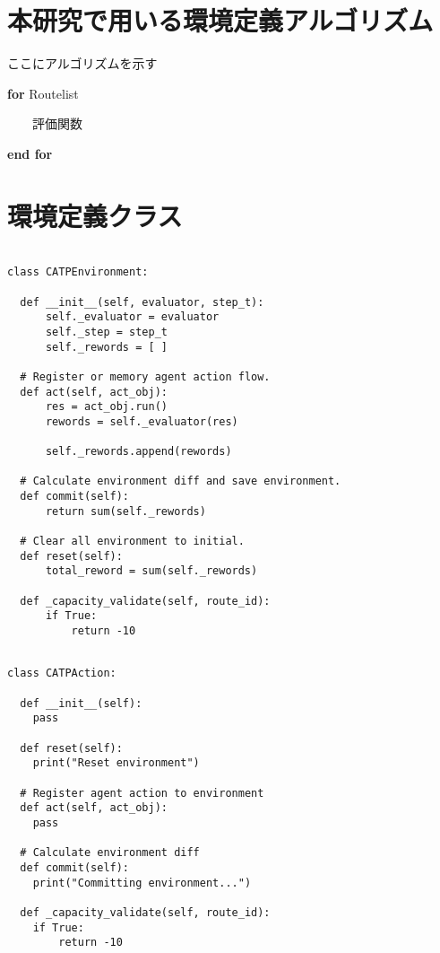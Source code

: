 \section{本研究で用いる環境定義アルゴリズム}

ここにアルゴリズムを示す

\textbf{for} Routelist

\ \ \ \ 評価関数

\textbf{end for}


\section{環境定義クラス}

\begin{lstlisting}[caption = 環境を構築するクラス, label = program1]

class CATPEnvironment:

  def __init__(self, evaluator, step_t):
      self._evaluator = evaluator
      self._step = step_t
      self._rewords = [ ]

  # Register or memory agent action flow.
  def act(self, act_obj):
      res = act_obj.run()
      rewords = self._evaluator(res)

      self._rewords.append(rewords)
  
  # Calculate environment diff and save environment.
  def commit(self):
      return sum(self._rewords)
  
  # Clear all environment to initial.
  def reset(self):
      total_reword = sum(self._rewords)

  def _capacity_validate(self, route_id):
      if True:
          return -10
\end{lstlisting}
  




\begin{lstlisting}[caption = 行動を定義するクラス, label = program1]

class CATPAction:

  def __init__(self):
    pass

  def reset(self):
    print("Reset environment")

  # Register agent action to environment
  def act(self, act_obj):
    pass

  # Calculate environment diff
  def commit(self):
    print("Committing environment...")

  def _capacity_validate(self, route_id):  
    if True:
        return -10  
\end{lstlisting}
  


